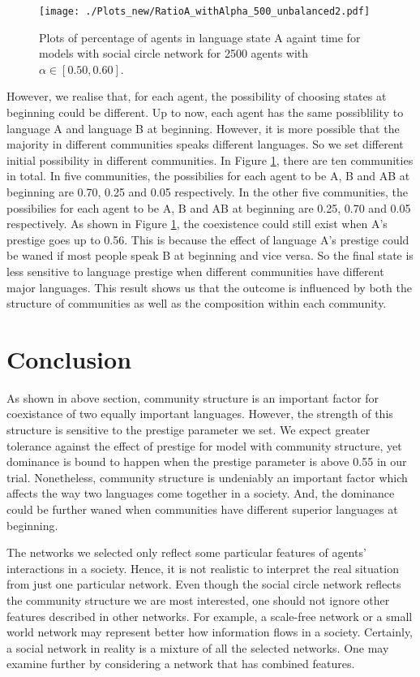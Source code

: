 \documentclass[a4paper, 11pt]{article}
\begin{document}
\begin{figure}[!tbp] 
  \centering
  \texttt{[image: ./Plots\_new/RatioA\_withAlpha\_500\_unbalanced2.pdf]}
\caption{Plots of percentage of agents in language state A againt time for models with social circle network for 2500 agents with $\alpha \in [0.50, 0.60]$. }
\label{comm_unbalance}
\end{figure}

However, we realise that, for each agent, the possibility of choosing states at beginning could be different. Up to now, each agent has the same possiblility to language A and language B at beginning. However, it is more possible that the majority in different communities speaks different languages. So we set different initial possibility in different communities. In Figure \ref{comm_unbalance}, there are ten communities in total. In five communities, the possibilies for each agent to be A, B and AB at beginning are 0.70, 0.25 and 0.05 respectively. In the other five communities, the possibilies for each agent to be A, B and AB at beginning are 0.25, 0.70 and 0.05 respectively. As shown in Figure \ref{comm_unbalance}, the coexistence could still exist when A's prestige goes up to 0.56. This is because the effect of language A's prestige could be waned if most people speak B at beginning and vice versa. So the final state is less sensitive to language prestige when different communities have different major languages. This result shows us that the outcome is influenced by both the structure of communities as well as the composition within each community. 

\section{Conclusion}

As shown in above section, community structure is an important factor for coexistance of two equally important languages. However, the strength of this structure is sensitive to the prestige parameter we set. We expect greater tolerance against the effect of prestige for model with community structure, yet dominance is bound to happen when the prestige parameter is above 0.55 in our trial. Nonetheless, community structure is undeniably an important factor which affects the way two languages come together in a society. And, the dominance could be further waned when communities have different superior languages at beginning.

The networks we selected only reflect some particular features of agents' interactions in a society. Hence, it is not realistic to interpret the real situation from just one particular network. Even though the social circle network reflects the community structure we are most interested, one should not ignore other features described in other networks. For example, a scale-free network or a small world network may represent better how information flows in a society.  Certainly, a social network in reality is a mixture of all the selected networks. One may examine further by considering a network that has combined features. 
\end{document}
